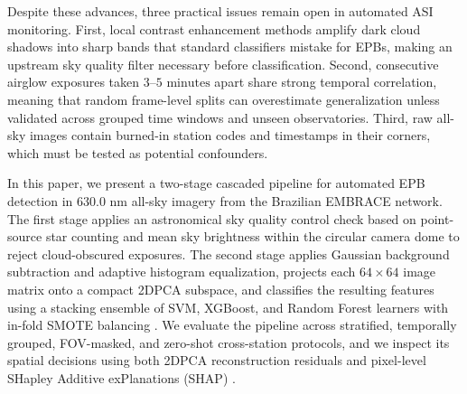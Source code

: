 Despite these advances, three practical issues remain open in automated ASI monitoring. First, local contrast enhancement methods amplify dark cloud shadows into sharp bands that standard classifiers mistake for EPBs, making an upstream sky quality filter necessary before classification. Second, consecutive airglow exposures taken $3\text{--}5\text{ minutes}$ apart share strong temporal correlation, meaning that random frame-level splits can overestimate generalization unless validated across grouped time windows and unseen observatories. Third, raw all-sky images contain burned-in station codes and timestamps in their corners, which must be tested as potential confounders.

In this paper, we present a two-stage cascaded pipeline for automated EPB detection in $630.0\text{ nm}$ all-sky imagery from the Brazilian EMBRACE network. The first stage applies an astronomical sky quality control check based on point-source star counting and mean sky brightness within the circular camera dome to reject cloud-obscured exposures. The second stage applies Gaussian background subtraction and adaptive histogram equalization, projects each $64 \times 64$ image matrix onto a compact 2DPCA subspace, and classifies the resulting features using a stacking ensemble \cite{wolpert1992stacked} of SVM, XGBoost, and Random Forest learners with in-fold SMOTE balancing \cite{chawla2002smote}. We evaluate the pipeline across stratified, temporally grouped, FOV-masked, and zero-shot cross-station protocols, and we inspect its spatial decisions using both 2DPCA reconstruction residuals and pixel-level SHapley Additive exPlanations (SHAP) \cite{lundberg2017unified}.
